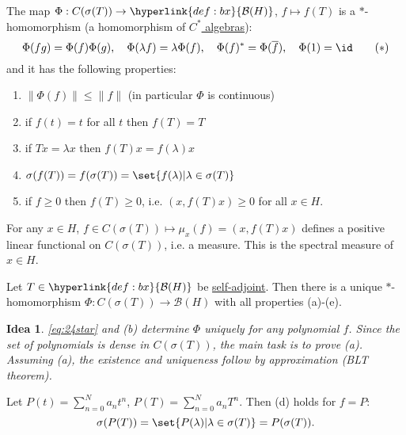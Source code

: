 \documentclass{article}
\newtheorem*{idea}{Idea}
\begin{document}
\begin{thm}
    The map $\Phi: C(\sigma(T)) \to \hyperlink{def:bx}{\mathcal{B}(H)}$, $f \mapsto f(T)$ is a $*$-homomorphism (a homomorphism of \hyperlink{def:cstar}{$C^*$ algebras}):
    \begin{equation*}
        \Phi(fg) = \Phi(f) \Phi(g), \quad \Phi(\lambda f) = \lambda \Phi(f), \quad \Phi(f)^* = \Phi(\overline{f}), \quad \Phi(1) = \id
        \tag{$*$} \label{eq:24star}
    \end{equation*}
    and it has the following properties:
    \begin{enumerate}[label=(\alph*)]
        \item $\|\Phi(f)\| \leq \|f\|$ (in particular $\Phi$ is continuous)
        \item if $f(t) = t$ for all $t$ then $f(T) = T$
        \item if $T x = \lambda x$ then $f(T) x = f(\lambda) x$
        \item $\sigma(f(T)) = f(\sigma(T)) = \set{f(\lambda) | \lambda \in \sigma(T)}$
        \item if $f \geq 0$ then $f(T) \geq 0$, i.e. $(x, f(T) x) \geq 0$ for all $x \in H$.
    \end{enumerate}
\end{thm}

\begin{remark}
    For any $x \in H$, $f \in C(\sigma(T)) \mapsto \mu_x(f) = (x, f(T) x)$ defines a positive linear functional on $C(\sigma(T))$, i.e. a measure.
    This is the spectral measure of $x \in H$.
\end{remark}

\begin{thm}
    Let $T \in \hyperlink{def:bx}{\mathcal{B}(H)}$ be \hyperlink{def:normalMap}{self-adjoint}.
    Then there is a unique $*$-homomorphism $\Phi: C(\sigma(T)) \to \mathcal{B}(H)$ with all properties (a)-(e).
\end{thm}

\begin{idea}
    \eqref{eq:24star} and (b) determine $\Phi$ uniquely for any polynomial $f$.
    Since the set of polynomials is dense in $C(\sigma(T))$, the main task is to prove (a).
    Assuming (a), the existence and uniqueness follow by approximation (BLT theorem).
\end{idea}

\begin{lemma}
    Let $P(t) = \sum_{n=0}^N a_n t^n$, $P(T) = \sum_{n=0}^N a_n T^n$. Then (d) holds for $f = P$:
    \begin{equation*}
        \sigma(P(T)) = \set{P(\lambda) | \lambda \in \sigma(T)} = P(\sigma(T)).
    \end{equation*}
\end{lemma}
\end{document}

